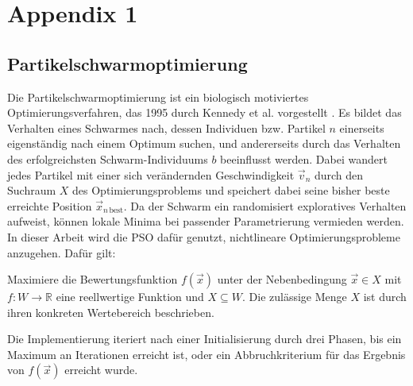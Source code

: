 \chapter{Appendix 1}
\label{chap:appendix1}


\section{Partikelschwarmoptimierung}
\label{appendix:pso}
Die Partikelschwarmoptimierung ist ein biologisch motiviertes Optimierungsverfahren, das 1995 durch Kennedy et al. vorgestellt \cite{Kennedy1995}.
Es bildet das Verhalten eines Schwarmes nach, dessen Individuen bzw. Partikel $n$ einerseits eigenständig nach einem Optimum suchen, und andererseits durch das Verhalten des erfolgreichsten Schwarm-Individuums $b$ beeinflusst werden.
Dabei wandert jedes Partikel mit einer sich verändernden Geschwindigkeit $\vec{v}_n$ durch den Suchraum $X$ des Optimierungsproblems und speichert dabei seine bisher beste erreichte Position $\vec{x}_{n\,\text{best}}$.
Da der Schwarm ein randomisiert exploratives Verhalten aufweist, können lokale Minima bei passender Parametrierung vermieden werden.
In dieser Arbeit wird die PSO dafür genutzt, nichtlineare Optimierungsprobleme anzugehen.
Dafür gilt:

Maximiere die Bewertungsfunktion $f(\vec{x})$ unter der Nebenbedingung $\vec{x}\in X$ mit $f\colon W\to \mathbb{R}$ eine reellwertige Funktion und $X \subseteq W$. 
Die zulässige Menge $X$ ist durch ihren konkreten Wertebereich beschrieben.

Die Implementierung iteriert nach einer Initialisierung durch drei Phasen, bis ein Maximum an Iterationen erreicht ist, oder ein Abbruchkriterium für das Ergebnis von $f(\vec{x})$ erreicht wurde.

